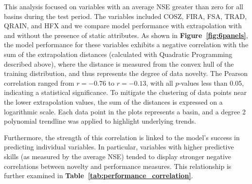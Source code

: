 \documentclass{article}
\begin{document}
This analysis focused on variables with an average NSE greater than zero for all basins during the test period. The variables included COSZ, FIRA, FSA, TRAD, QRAIN, and HFX and we compare model performance with extrapolation with and without the presence of static attributes. As shown in \textbf{Figure~\ref{fig:6panels}}, the model performance for these variables exhibits a negative correlation with the sum of the extrapolation distances (calculated with Quadratic Programming described above), where the distance is measured from the convex hull of the training distribution, and thus represents the degree of data novelty. The Pearson correlation ranged from $r=-0.76$ to $r=-0.13$, with all $p$-values less than 0.05, indicating a statistical significance. To mitigate the clustering of data points near the lower extrapolation values, the sum of the distances is expressed on a logarithmic scale. Each data point in the plots represents a basin, and a degree 2 polynomial trendline was applied to highlight underlying trends.

Furthermore, the strength of this correlation is linked to the model's success in predicting individual variables. In particular, variables with higher predictive skills (as measured by the average NSE) tended to display stronger negative correlations between novelty and performance measures. This relationship is further examined in \textbf{Table~\ref{tab:performance_correlation}}.
\end{document}
